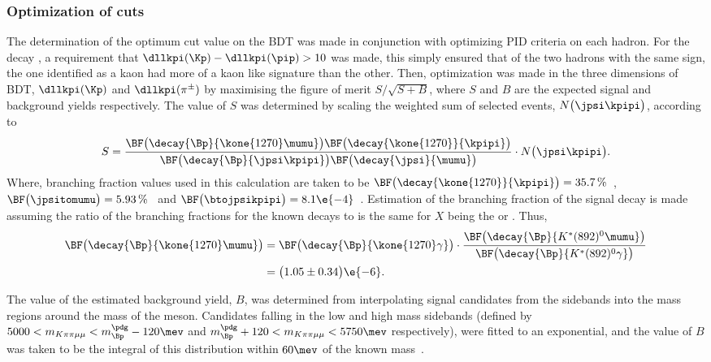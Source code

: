 \subsubsection[Optimization of \btokpipimumu cuts]
{Optimization of \tmath{\btokpipimumu} cuts}
\label{sssec:opt:kpipi}
The determination of the optimum cut value on the BDT was made in conjunction with optimizing PID
criteria on each hadron.
For the decay \btokpipimumu, a requirement that $\dllkpi(\Kp)-\dllkpi(\pip)>10$ was made, this
simply ensured that of the two hadrons with the same sign, the one identified as a kaon had more of
a kaon like signature than the other.
Then, optimization was made in the three dimensions of BDT, $\dllkpi(\Kp)$ and $\dllkpi(\pi^\pm)$
by maximising the figure of merit $S/\sqrt{S+B}$, where $S$ and $B$ are the expected signal and
background yields respectively.
The value of $S$ was determined by scaling the weighted sum of selected \btojpsikpipi events,
$N\big(\jpsi\kpipi\big)$, according to
\begin{equation}
  S =
  \frac{
    \BF\big(\decay{\Bp}{\kone{1270}\mumu}\big)
    \BF\big(\decay{\kone{1270}}{\kpipi}\big)
  }{
    \BF\big(\decay{\Bp}{\jpsi\kpipi}\big)
    \BF\big(\decay{\jpsi}{\mumu}\big)
  }
  \cdot
  N\big(\jpsi\kpipi\big).
\end{equation}
Where, branching fraction values used in this calculation are taken to be
$\BF\big(\decay{\kone{1270}}{\kpipi}\big) = 35.7\,\%$~\cite{PDG2012},
$\BF\big(\jpsitomumu\big) = 5.93\,\%$~\cite{PDG2012} and
$\BF\big(\btojpsikpipi\big) = 8.1\e{-4}$~\cite{PDG2012}.
Estimation of the branching fraction of the signal decay  is made
assuming the ratio of the branching fractions for the known decays  to
is the same for $X$ being the  or \Kstarent.
Thus,
\begin{align}
  \BF\big(\decay{\Bp}{\kone{1270}\mumu}\big)
  &=
  \BF\big(\decay{\Bp}{\kone{1270}\gamma}\big)
  \cdot\frac{
    \BF\big(\decay{\Bp}{K^*(892)^0\mumu}\big)
  }{
  \BF\big(\decay{\Bp}{K^*(892)^0\gamma}\big)
  }\nonumber\\
  &=\big(1.05\pm0.34\big)\e{-6}.
\end{align}


The value of the estimated background yield, $B$, was determined from interpolating signal
\btokpipimumu candidates from the sidebands into the mass regions around the mass of the \Bp meson.
Candidates falling in the low and high mass sidebands
(defined by $5000<m_{K\pi\pi\mu\mu}<m_{\Bp}^\pdg-120\mev$ and
$m_{\Bp}^\pdg+120<m_{K\pi\pi\mu\mu}<5750\mev$ respectively),
were fitted to an exponential, and the value of $B$ was taken to be the integral of this
distribution within $60\mev$ of the known \Bp mass~\cite{PDG2012}.

